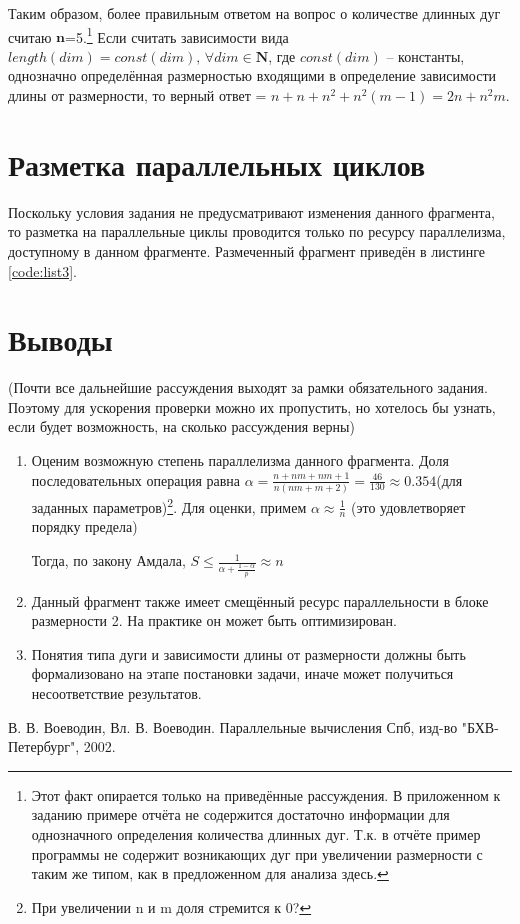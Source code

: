 \documentclass[12pt, fleqn]{article}
\theoremstyle{definition}
\newenvironment{packed_enum}{
\begin{enumerate}
  \setlength{\itemsep}{1pt}
  \setlength{\parskip}{0pt}
  \setlength{\parsep}{0pt}
}{\end{enumerate}}
\begin{document}
\begin{packed_enum}
Таким образом, более правильным ответом на вопрос о количестве длинных дуг считаю $\mathbf{n}$=5.\footnote{Этот факт опирается только на приведённые рассуждения. В приложенном к заданию примере отчёта не содержится достаточно информации для однозначного определения количества длинных дуг. Т.к. в отчёте пример программы не содержит возникающих дуг при увеличении размерности с таким же типом, как в предложенном для анализа здесь.}
Если считать зависимости вида $length(dim) = const(dim), \, \forall dim \in \mathbf{N}$, где $const(dim)$ -- константы, однозначно определённая размерностью входящими в определение зависимости длины от размерности, то верный ответ = $n + n + n^2 + n^2 (m - 1) = 2n + n^2m$.
\end{packed_enum}

\section{Разметка параллельных циклов}
Поскольку условия задания не предусматривают изменения данного фрагмента, то разметка на параллельные циклы проводится только по ресурсу параллелизма, доступному в данном фрагменте.
Размеченный фрагмент приведён в листинге \ref{code:list3}.
{}
\section{Выводы}
(Почти все дальнейшие рассуждения выходят за рамки обязательного задания. Поэтому для ускорения проверки можно их пропустить, но хотелось бы узнать, если будет возможность, на сколько рассуждения верны)
\begin{enumerate}
 \item Оценим возможную степень параллелизма данного фрагмента. Доля последовательных операция равна $\alpha = \frac{n + nm + nm + 1}{n(nm + m + 2)} = \frac{46}{130} \approx 0.354$(для заданных параметров)\footnote{При увеличении n и m доля стремится к 0?}. Для оценки, примем $\alpha \approx \frac{1}{n}$ (это удовлетворяет порядку предела)
 
 Тогда, по закону Амдала, $S \leq \frac{1}{\alpha + \frac{1-\alpha}{p}} \approx n$
 \item Данный фрагмент также имеет смещённый ресурс параллельности в блоке размерности 2. На практике он может быть оптимизирован.
 \item Понятия типа дуги и зависимости длины от размерности должны быть формализовано на этапе постановки задачи, иначе может получиться несоответствие результатов.
\end{enumerate}

\newpage
\begin{thebibliography}{}
 В. В. Воеводин, Вл. В. Воеводин. Параллельные вычисления Спб, изд-во "БХВ-Петербург", 2002.

\end{thebibliography}
\end{document}
